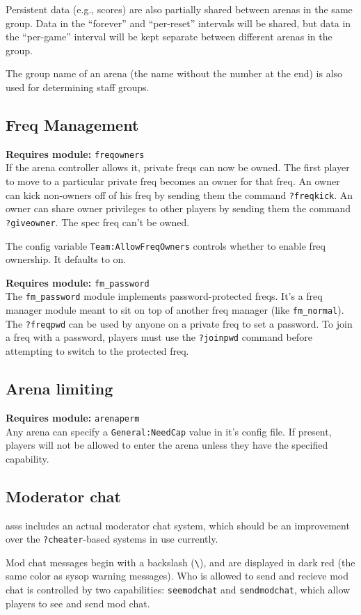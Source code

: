 \documentclass{article}
\newcommand{\asss}{asss}
\newcommand{\requiremod}[1]{\noindent\textbf{Requires module:} \texttt{#1}\\}
\begin{document}
Persistent data (e.g., scores) are also partially shared between arenas
in the same group. Data in the ``forever'' and ``per-reset'' intervals
will be shared, but data in the ``per-game'' interval will be kept
separate between different arenas in the group.

The group name of an arena (the name without the number at the end) is
also used for determining staff groups.

\subsection{Freq Management}

\requiremod{freqowners}
If the arena controller allows it, private freqs can now be owned. The
first player to move to a particular private freq becomes an owner for
that freq. An owner can kick non-owners off of his freq by sending them
the command \verb/?freqkick/. An owner can share owner privileges to
other players by sending them the command \verb/?giveowner/. The spec
freq can't be owned.

The config variable \texttt{Team:AllowFreqOwners} controls whether to
enable freq ownership. It defaults to on.

\requiremod{fm\_password}
The \verb/fm_password/ module implements password-protected freqs. It's
a freq manager module meant to sit on top of another freq manager (like
\verb/fm_normal/). The \verb/?freqpwd/ can be used by anyone on a
private freq to set a password. To join a freq with a password, players
must use the \verb/?joinpwd/ command before attempting to switch to the
protected freq.

\subsection{Arena limiting}

\requiremod{arenaperm}
Any arena can specify a \texttt{General:NeedCap} value in it's config
file. If present, players will not be allowed to enter the arena unless
they have the specified capability.


\subsection{Moderator chat}

\asss{} includes an actual moderator chat system, which should be an
improvement over the \verb/?cheater/-based systems in use currently.

Mod chat messages begin with a backslash (\verb/\/), and are displayed
in dark red (the same color as sysop warning messages). Who is allowed
to send and recieve mod chat is controlled by two capabilities:
\texttt{seemodchat} and \texttt{sendmodchat}, which allow players to see
and send mod chat.
\end{document}
